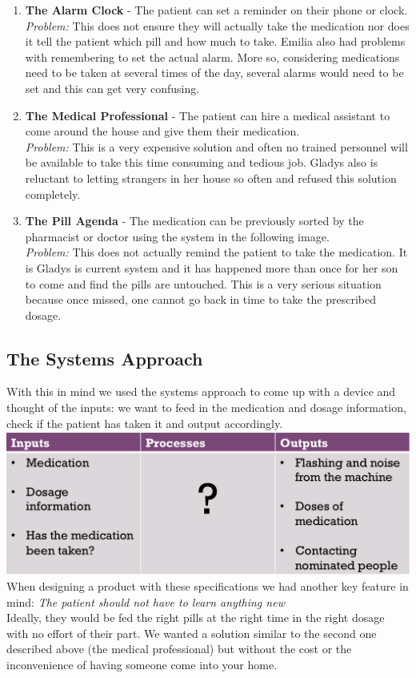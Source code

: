 \documentclass{article}
\begin{document}
	\begin{enumerate}
	\item \textbf{The Alarm Clock} - The patient can set a reminder on their phone or clock. \\ \emph{Problem:} This does not ensure they will actually take the medication nor does it tell the patient which pill and how much to take. Emilia also had problems with remembering to set the actual alarm. More so, considering medications need to be taken at several times of the day, several alarms would need to be set and this can get very confusing.
	\item \textbf{The Medical Professional} - The patient can hire a medical assistant to come around the house and give them their medication. \\ \emph{Problem:} This is a very expensive solution and often no trained personnel will be available to take this time consuming and tedious job. Gladys also is reluctant to letting strangers in her house so often and refused this solution completely.
	\item \textbf{The Pill Agenda} - The medication can be previously sorted by the pharmacist or doctor using the system in the following image. \\ \emph{Problem:} This does not actually remind the patient to take the medication. It is Gladys is current system and it has happened more than once for her son to come and find the pills are untouched. This is a very serious situation because once missed, one cannot go back in time to take the prescribed dosage.
	\end{enumerate}

	\subsection{The Systems Approach}
	With this in mind we used the systems approach to come up with a device and thought of the inputs: we want to feed in the medication and dosage information, check if the patient has taken it and output accordingly. \bigskip \\ \includegraphics[width=\textwidth]{systems.png} \bigskip \\
	When designing a product with these specifications we had another key feature in mind: \emph{The patient should not have to learn anything new} \medskip \\ Ideally, they would be fed the right pills at the right time in the right dosage with no effort of their part. We wanted a solution similar to the second one described above (the medical professional) but without the cost or the inconvenience of having someone come into your home.
\end{document}
